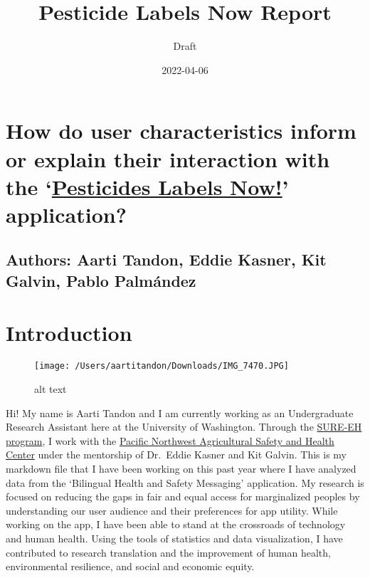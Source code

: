 \documentclass[
]{article}
\title{Pesticide Labels Now Report}
\subtitle{Draft}
\author{}
\date{\vspace{-2.5em}2022-04-06}
\begin{document}
\maketitle

{
\setcounter{tocdepth}{4}
\tableofcontents
}
\tableofcontents

\hypertarget{how-do-user-characteristics-inform-or-explain-their-interaction-with-the-pesticides-labels-now-application}{%
\section{\texorpdfstring{How do user characteristics inform or explain
their interaction with the
`\href{https://deohs.washington.edu/pnash/LabelsNow}{Pesticides Labels
Now!}'
application?}{How do user characteristics inform or explain their interaction with the `Pesticides Labels Now!' application?}}\label{how-do-user-characteristics-inform-or-explain-their-interaction-with-the-pesticides-labels-now-application}}

\hypertarget{authors-aarti-tandon-eddie-kasner-kit-galvin-pablo-palmuxe1ndez}{%
\subsection{Authors: Aarti Tandon, Eddie Kasner, Kit Galvin, Pablo
Palmández}\label{authors-aarti-tandon-eddie-kasner-kit-galvin-pablo-palmuxe1ndez}}

\hypertarget{introduction}{%
\section{Introduction}\label{introduction}}

\begin{figure}
\centering
\texttt{[image: /Users/aartitandon/Downloads/IMG\_7470.JPG]}
\caption{alt text}
\end{figure}

Hi! My name is Aarti Tandon and I am currently working as an
Undergraduate Research Assistant here at the University of Washington.
Through the \href{https://deohs.washington.edu/apply-sure-eh}{SURE-EH
program}, I work with the
\href{https://deohs.washington.edu/pnash/}{Pacific Northwest
Agricultural Safety and Health Center} under the mentorship of Dr.~Eddie
Kasner and Kit Galvin. This is my markdown file that I have been working
on this past year where I have analyzed data from the `Bilingual Health
and Safety Messaging' application. My research is focused on reducing
the gaps in fair and equal access for marginalized peoples by
understanding our user audience and their preferences for app utility.
While working on the app, I have been able to stand at the crossroads of
technology and human health. Using the tools of statistics and data
visualization, I have contributed to research translation and the
improvement of human health, environmental resilience, and social and
economic equity.
\end{document}
